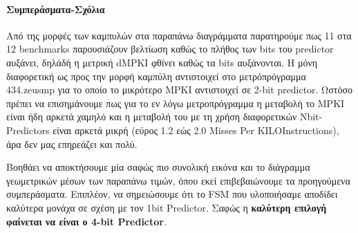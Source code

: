 \paragraph{Συμπεράσματα-Σχόλια}
    Από της μορφές των καμπυλών στα παραπάνω διαγράμματα παρατηρούμε πως 11 στα
    12 benchmarks παρουσιάζουν βελτίωση καθώς το πλήθος των bits του predictor
    αυξάνει, δηλάδή η μετρική dMPKI φθίνει καθώς τα bits αυξάνονται. Η μόνη
    διαφορετική ως προς την μορφή καμπύλη αντιστοιχεί στο μετρόπρόγραμμα
    434.zeusmp για το οποίο το μικρότερο MPKI αντιστοιχεί σε 2-bit predictor.
    Ωστόσο πρέπει να επισημάνουμε πως για το εν λόγω μετροπρόγραμμα η μεταβολή
    το MPKI είναι ήδη αρκετά χαμηλό και η μεταβολή του με τη χρήση διαφορετικών
    Nbit-Predictors είναι αρκετά μικρή (εύρος 1.2 εώς 2.0 Misses Per
    KILOInstructions), άρα δεν μας επηρεάζει και πολύ.

    Βοηθάει να αποκτήσουμε μία σαφώς πιο συνολική εικόνα και το διάγραμμα
    γεωμετρικών μέσων των παραπάνω τιμών, όπου εκεί επιβεβαιώνουμε τα
    προηγούμενα συμπεράσματα. Επιπλέον, να σημειώσουμε ότι το FSM που
    υλοποιήσαμε αποδίδει καλύτερα μονάχα σε σχέση με τον 1bit Predictor. Σαφώς η
    \textbf{καλύτερη επιλογή φαίνεται να είναι ο 4-bit Predictor}.

